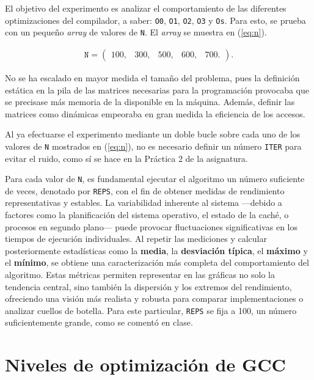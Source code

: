 \documentclass[11pt,a4paper,twoside]{article}
\theoremstyle{definition}
\begin{document}
	El objetivo del experimento es analizar el comportamiento de las diferentes optimizaciones del compilador, a saber: \texttt{O0}, \texttt{O1}, \texttt{O2}, \texttt{O3} y \texttt{Os}. Para esto, se prueba con un pequeño \textit{array} de valores de \texttt{N}. El \textit{array} se muestra en (\ref{eq:n}).
	
	\begin{equation}\label{eq:n}
		\begin{aligned}
			\texttt{N} = \left(
			\begin{matrix}
				100, & 300, & 500, & 600, & 700.
			\end{matrix}
			\right).
		\end{aligned}
	\end{equation}

	No se ha escalado en mayor medida el tamaño del problema, pues la definición estática en la pila de las matrices necesarias para la programación provocaba que se precisase más memoria de la disponible en la máquina. Además, definir las matrices como dinámicas empeoraba en gran medida la eficiencia de los accesos.

	Al ya efectuarse el experimento mediante un doble bucle sobre cada uno de los valores de \texttt{N} mostrados en (\ref{eq:n}), no es necesario definir un número \texttt{ITER} para evitar el ruido, como sí se hace en la Práctica 2 de la asignatura.

	Para cada valor de \texttt{N}, es fundamental ejecutar el algoritmo un número suficiente de veces, denotado por \texttt{REPS}, con el fin de obtener medidas de rendimiento representativas y estables. La variabilidad inherente al sistema ---debido a factores como la planificación del sistema operativo, el estado de la caché, o procesos en segundo plano--- puede provocar fluctuaciones significativas en los tiempos de ejecución individuales. Al repetir las mediciones y calcular posteriormente estadísticas como la \textbf{media}, la \textbf{desviación típica}, el \textbf{máximo} y el \textbf{mínimo}, se obtiene una caracterización más completa del comportamiento del algoritmo. Estas métricas permiten representar en las gráficas no solo la tendencia central, sino también la dispersión y los extremos del rendimiento, ofreciendo una visión más realista y robusta para comparar implementaciones o analizar cuellos de botella. Para este particular, \texttt{REPS} se fija a 100, un número suficientemente grande, como se comentó en clase.
		
	
	\section{Niveles de optimización de GCC}
\end{document}
